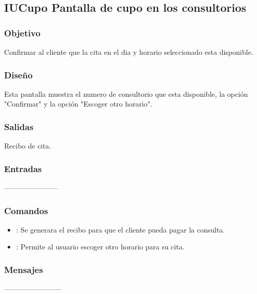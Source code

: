 \subsection{IUCupo Pantalla de cupo en los consultorios}

\subsubsection{Objetivo}
	Confirmar al cliente que la cita en el d\´ia y horario seleccionado esta disponible.

\subsubsection{Diseño}
	Esta pantalla muestra el numero de consultorio que esta disponible, la opci\'on "Confirmar" y la opci\'on "Escoger otro horario".

    
\subsubsection{Salidas}
    Recibo de cita.

\subsubsection{Entradas}
-----------------------

\subsubsection{Comandos}
\begin{itemize}
		\item {}: Se generara el recibo para que el cliente pueda pagar la consulta.
		\item {}: Permite al usuario escoger otro horario para su cita.
\end{itemize}

\subsubsection{Mensajes}
------------------------